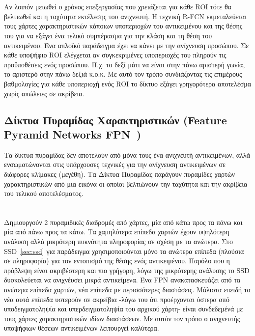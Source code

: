 \paragraph{} \hspace{0em} \\
Αν λοιπόν μειωθεί ο χρόνος επεξεργασίας που χρειάζεται για κάθε ROI τότε θα
βελτιωθεί και η ταχύτητα εκτέλεσης του ανιχνευτή. Η τεχνική R-FCN εκμεταλεύεται
τους χάρτες χαρακτηριστικών κάποιων υποπεριοχών του αντικειμένου και της θέσης του
για να εξάγει ένα τελικό συμπέρασμα για την κλάση και τη θέση του αντικειμένου. Ένα
απλοϊκό παράδειγμα έχει να κάνει με την ανίχνευση προσώπου. Σε κάθε υποψήφιο ROI
ελέγχεται αν συγκεκριμένες υποπεριοχές του πληρούν τις προϋποθέσεις ενός προσώπου.
Π.χ. το δεξί μάτι να είναι στην πάνω αριστερή γωνία, το αριστερό στην πάνω δεξιά κ.ο.κ.
Με αυτό τον τρόπο συνδιάζοντας τις επιμέρους  βαθμολογίες για κάθε υποπεριοχή ενός
ROI το δίκτυο εξάγει γρηγορότερα αποτελέσμα χωρίς απώλειες σε ακρίβεια.

\subsection{Δίκτυα Πυραμίδας Χαρακτηριστικών (Feature Pyramid Networks FPN~\cite{DBLP:journals/corr/LinDGHHB16})}\label{sec:fpn}
Τα δίκτυα πυραμίδας δεν αποτελούν από μόνα τους ένα ανιχνευτή αντικειμένων, αλλά
ενσωματώνονται στις υπάρχουσες τεχνικές για την ανίχνευση αντικειμένων σε διάφορες
κλίμακες (μεγέθη). Τα Δίκτυα Πυραμίδας παράγουν πυραμίδες χαρτών χαρακτηριστικών από
μια εικόνα οι οποίοι βελτιώνουν την ταχύτητα και την ακρίβεια του τελικού αποτελέσματος.
\paragraph{} \hspace{0em} \\
Δημιουργούν 2 πυραμιδικές διαδρομές από χάρτες, μία από κάτω προς τα πάνω και μία
από πάνω προς τα κάτω. Τα χαμηλότερα επίπεδα χαρτών έχουν υψηλότερη ανάλυση αλλά
μικρότερη πυκνότητα πληροφορίας σε σχέση με τα ανώτερα. Στο SSD~\ref{sec:ssd} για παράδειγμα
χρησιμοποιούνται μόνο τα ανώτερα επίπεδα (πλούσια σε πληροφορία) για τον εντοπισμό
της θέσης ενός αντικειμένου. Παρόλο που η πρόβλεψη είναι ακριβέστερη και πιο γρήγορη,
λόγω της μικρότερης ανάλυσης το SSD δυσκολεύεται να ανιχνέυσει μικρά αντικείμενα.
Ένα FPN ανακατασκευάζει από τα ανώτερα επίπεδα χαρτών, νέα επίπεδα με περισσότερες διαστάσεις.
Μάλιστα επειδή τα νέα  αυτά επίπεδα υστερούν σε ακρείβια -λόγω του ότι προέρχονται ύστερα από υποδειγματοληψία
και υπερδειγματοληψία του αρχικού χάρτη- είναι συνδεδεμένά με τους χάρτες χαρακτηριστικών
ιδίων διαστάσεων. Με αυτόν τον τρόπο ο ανιχνευτής υποψήφιων θέσεων αντικειμένων
λειτουργεί καλύτερα.
